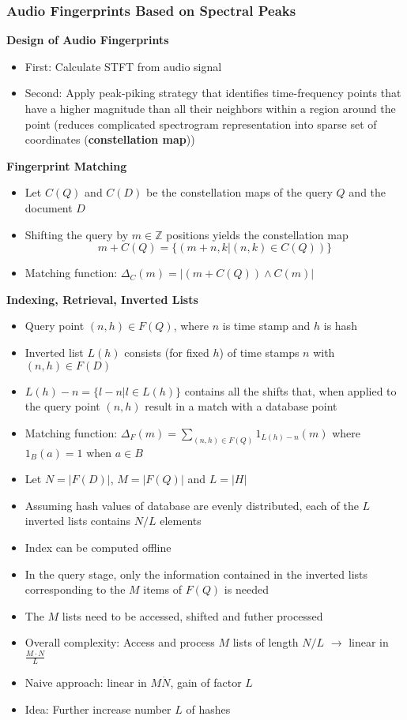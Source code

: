 \documentclass{scrartcl}
\newcommand{\ffrac}[2]{\ensuremath{\frac{\displaystyle #1}{\displaystyle #2}}}
\begin{document}
\subsubsection*{Audio Fingerprints Based on Spectral Peaks}
\textbf{Design of Audio Fingerprints}
\begin{itemize}
    \item
        First: Calculate STFT from audio signal
    \item
        Second: Apply peak-piking strategy that identifies time-frequency points that have a higher magnitude than all their neighbors within a region around the point (reduces complicated spectrogram representation into sparse set of coordinates (\textbf{constellation map}))
\end{itemize}
\textbf{Fingerprint Matching}
\begin{itemize}
    \item
        Let $C(Q)$ and $C(D)$ be the constellation maps of the query $Q$ and the document $D$
    \item
        Shifting the query by $m \in \mathbb{Z}$ positions yields the constellation map
        $$ m + C(Q) = \{(m + n, k | (n,k) \in C(Q))\}$$
    \item
        Matching function: $\Delta_C(m) = |(m + C(Q)) \land C(m)|$
\end{itemize}
\textbf{Indexing, Retrieval, Inverted Lists}
\begin{itemize}
    \item
        Query point $(n,h) \in F(Q)$, where $n$ is time stamp and $h$ is hash
    \item
        Inverted list $L(h)$ consists (for fixed $h$) of time stamps $n$ with $(n, h) \in F(D)$
    \item
        $L(h) - n = \{ l - n | l \in L(h)\}$ contains all the shifts that, when applied to the query point $(n,h)$ result in a match with a database point
    \item
        Matching function: $\Delta_F (m) = \sum_{(n,h) \in F(Q)} 1_{L(h) - n}(m)$ where $ 1_B(a) = 1$ when $a \in B$\\
    \item
        Let $N = |F(D)|$, $M = |F(Q)|$ and $L = |H|$
    \item
        Assuming hash values of database are evenly distributed, each of the $L$ inverted lists contains $N/L$ elements
    \item
        Index can be computed offline
    \item
        In the query stage, only the information contained in the inverted lists corresponding to the $M$ items of $F(Q)$ is needed
    \item
        The $M$ lists need to be accessed, shifted and futher processed
    \item
        Overall complexity: Access and process $M$ lists of length $N/L$ $\rightarrow$ linear in $\ffrac{M\cdot N}{L}$
    \item
        Naive approach: linear in $M \dot N$, gain of factor $L$ 
    \item
        Idea: Further increase number $L$ of hashes
\end{itemize}
\end{document}

